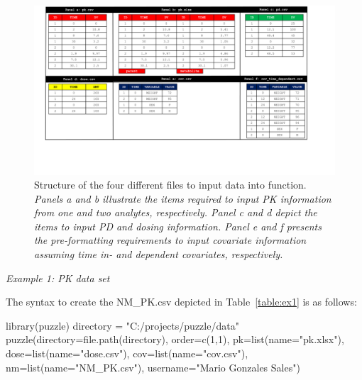 \begin{figure}[!ht]
  \centering
  \includegraphics[trim=1.3cm 4cm 1.5cm 0cm,  clip=true, scale=0.70, angle =90]{Figure1}
   \caption{Structure of the four different files to input data into  function. \textit{Panels a and b illustrate the items required to input PK information from one and two analytes, respectively. Panel c and d depict the items to input PD and dosing information. Panel e and f presents the pre-formatting requirements to input covariate information assuming time in- and dependent covariates, respectively.}}
  \label{figure:fig1}
\end{figure}

\newpage

\textit{Example 1: PK data set}

The syntax to create the NM\_PK.csv depicted in Table~\ref{table:ex1} is as follows:
\begin{example}
library(puzzle)
directory = "C:/projects/puzzle/data"
puzzle(directory=file.path(directory),
       order=c(1,1),
       pk=list(name="pk.xlsx"), 
       dose=list(name="dose.csv"), 
       cov=list(name="cov.csv"), 
       nm=list(name="NM_PK.csv"),
       username="Mario Gonzales Sales")
       \end{example}
 
